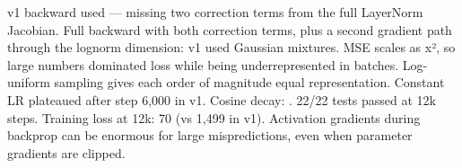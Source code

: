 {}
\markdownRendererSectionEnd \markdownRendererSectionBegin
{}\markdownRendererInterblockSeparator
{} v1 backward used  — missing two correction terms from the full LayerNorm Jacobian.\markdownRendererParagraphSeparator
{} Full backward with both correction terms, plus a second gradient path through the log\markdownRendererUnderscore{}norm dimension:\markdownRendererInterblockSeparator
{}\markdownRendererInterblockSeparator
{}
\markdownRendererSectionEnd \markdownRendererSectionBegin
{}\markdownRendererInterblockSeparator
{} v1 used Gaussian mixtures. MSE scales as x², so large numbers dominated loss while being underrepresented in batches.\markdownRendererParagraphSeparator
{} Log-uniform sampling gives each order of magnitude equal representation.\markdownRendererInterblockSeparator
{}
\markdownRendererSectionEnd \markdownRendererSectionBegin
{}\markdownRendererInterblockSeparator
{} Constant LR plateaued after step \markdownRendererTilde{}6,000 in v1.\markdownRendererParagraphSeparator
{} Cosine decay: .\markdownRendererParagraphSeparator
{} 22/22 tests passed at 12k steps. Training loss at 12k: \markdownRendererTilde{}70 (vs \markdownRendererTilde{}1,499 in v1).\markdownRendererInterblockSeparator
{}\markdownRendererThematicBreak{}\markdownRendererInterblockSeparator
{}
\markdownRendererSectionEnd 
\markdownRendererSectionEnd \markdownRendererSectionBegin
{}\markdownRendererInterblockSeparator
{}\markdownRendererSectionBegin
{}\markdownRendererInterblockSeparator
{} Activation gradients during backprop can be enormous for large mispredictions, even when parameter gradients are clipped.\markdownRendererParagraphSeparator
